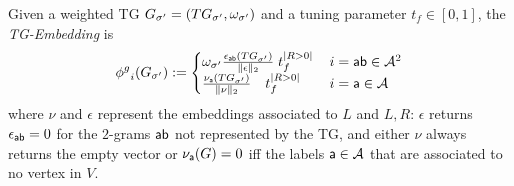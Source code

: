 \begin{definition}[TG-Embedding]\label{def:ppne}
	Given a weighted TG $G_{\sigma'}=(TG_{{\sigma'}},\omega_{\sigma'})$ and a tuning parameter $t_f\in[0,1]$, the \emph{TG-Embedding} is
	$${\phi^{g}}_{i}(G_{\sigma'}):=\begin{cases}
	\omega_{\sigma'} \frac{\epsilon_{\mathsf{ab}}(TG_{{\sigma'}})}{\|\epsilon\|_2}\;t_f^{|R>0|}\, & {i}=\mathsf{ab}\in\mathcal{A}^2\\
	\frac{\nu_{\mathsf{a}}(TG_{{\sigma'}})}{\|\nu\|_2}\;\;\;\,t_f^{|R>0|}\, & {i}=\mathsf{a}\in\mathcal{A}\\
	\end{cases}$$
	where $\nu$ and $\epsilon$ represent the embeddings associated to $L$ and $L,R$: $\epsilon$  returns
	$\epsilon_{\mathsf{ab}}=0$ for the $2$-grams $\mathsf{ab}$ not represented by the TG, and either $\nu$ always returns the empty
	vector or $\nu_{\mathsf{a}}(G)=0$ iff the labels $\mathsf{a}\in\mathcal{A}$ that are associated to no vertex in $V$.
\end{definition}

